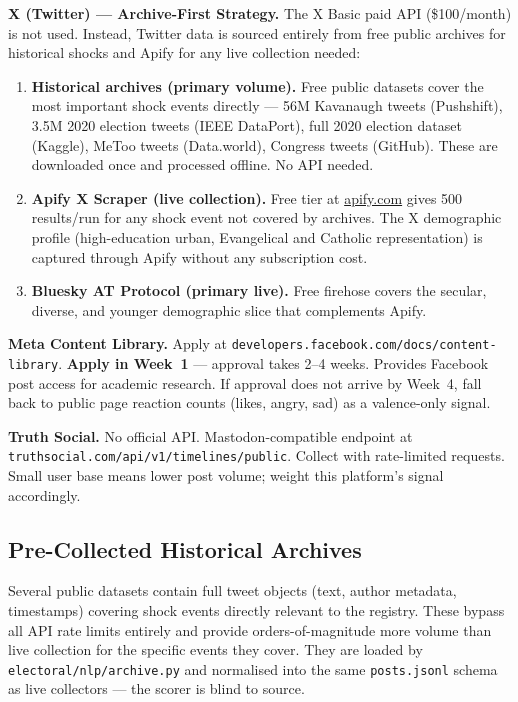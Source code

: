 \documentclass[11pt]{article}
\begin{document}
\textbf{X (Twitter) --- Archive-First Strategy.} The X Basic paid API
(\$100/month) is not used. Instead, Twitter data is sourced entirely from free
public archives for historical shocks and Apify for any live collection needed:

\begin{enumerate}[leftmargin=2em, itemsep=1pt]
  \item \textbf{Historical archives (primary volume).} Free public datasets cover
        the most important shock events directly --- 56M Kavanaugh tweets
        (Pushshift), 3.5M 2020 election tweets (IEEE DataPort), full 2020
        election dataset (Kaggle), MeToo tweets (Data.world), Congress tweets
        (GitHub). These are downloaded once and processed offline. No API needed.
  \item \textbf{Apify X Scraper (live collection).} Free tier at \url{apify.com}
        gives 500 results/run for any shock event not covered by archives. The
        X demographic profile (high-education urban, Evangelical and Catholic
        representation) is captured through Apify without any subscription cost.
  \item \textbf{Bluesky AT Protocol (primary live).} Free firehose covers the
        secular, diverse, and younger demographic slice that complements Apify.
\end{enumerate}

\textbf{Meta Content Library.} Apply at \texttt{developers.facebook.com/docs/content-library}.
\textbf{Apply in Week~1} --- approval takes 2--4 weeks. Provides Facebook post access
for academic research. If approval does not arrive by Week~4, fall back to public page
reaction counts (likes, angry, sad) as a valence-only signal.

\textbf{Truth Social.} No official API. Mastodon-compatible endpoint at
\texttt{truthsocial.com/api/v1/}\allowbreak\texttt{timelines/public}. Collect with rate-limited requests.
Small user base means lower post volume; weight this platform's signal accordingly.

\subsection*{Pre-Collected Historical Archives}

Several public datasets contain full tweet objects (text, author metadata, timestamps)
covering shock events directly relevant to the registry. These bypass all API rate
limits entirely and provide orders-of-magnitude more volume than live collection
for the specific events they cover. They are loaded by
\texttt{electoral/nlp/archive.py} and normalised into the same
\texttt{posts.jsonl} schema as live collectors --- the scorer is blind to source.
\end{document}
